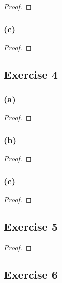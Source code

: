 \documentclass[14pt]{extarticle}
\begin{document}
\begin{proof}

\end{proof}

\subsubsection{(c)}

\begin{proof}

\end{proof}

\subsection{Exercise 4}

\subsubsection{(a)}

\begin{proof}

\end{proof}

\subsubsection{(b)}

\begin{proof}

\end{proof}

\subsubsection{(c)}

\begin{proof}

\end{proof}

\subsection{Exercise 5}

\begin{proof}

\end{proof}

\subsection{Exercise 6}
\end{document}
